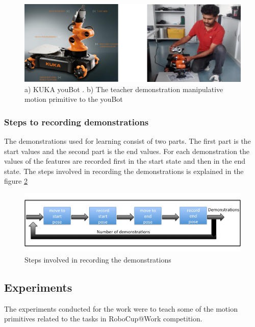 \begin{figure}[htp]
\centering
\includegraphics[scale=0.9]{images/kuka_teaching.png}
\caption[KUKA youBot kinesthetic teaching]{a) KUKA youBot \footnotemark . b) The teacher demonstration manipulative motion primitive to the youBot}
\label{youBot}
\end{figure}

\subsubsection{Steps to recording demonstrations}
The demonstrations used for learning consist of two parts.
The first part is the start values and the second part is the end values.
For each demonstration the values of the features are recorded first in the start state and then 
in the end state.
The steps involved in recording the demonstrations is explained in the figure \ref{record demonstration}
\begin{figure}[!htp]
\centering
\includegraphics[scale=0.5]{images/record_readings.png}
\caption[Recording demonstrations]{Steps involved in recording the demonstrations}
\label{record demonstration}
\end{figure}


\FloatBarrier
\subsection{Experiments}
The experiments conducted for the work were to teach
some of the motion primitives related to the tasks in RoboCup@Work competition.

